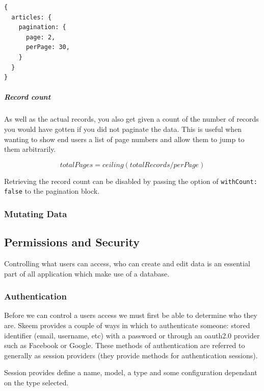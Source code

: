 \documentclass[
  12pt,
]{article}
\newcommand{\passthrough}[1]{#1}
\let\oldsubparagraph\subparagraph
\renewcommand{\subparagraph}[1]{\oldsubparagraph{#1}\mbox{}}
\begin{document}
\begin{lstlisting}[caption={This query will return the second page of articles where each page holds 30 records.}]
{
  articles: {
    pagination: {
      page: 2,
      perPage: 30,
    }
  }
}
\end{lstlisting}

\hypertarget{record-count}{%
\subparagraph{Record count}\label{record-count}}

As well as the actual records, you also get given a count of the number
of records you would have gotten if you did not paginate the data. This
is useful when wanting to show end users a list of page numbers and
allow them to jump to them arbitrarily.

\[ totalPages = ceiling( totalRecords / perPage ) \]

Retrieving the record count can be disabled by passing the option of
\passthrough{\lstinline!withCount: false!} to the pagination block.

\hypertarget{mutating-data}{%
\subsubsection{Mutating Data}\label{mutating-data}}

\hypertarget{permissions-and-security}{%
\subsection{Permissions and Security}\label{permissions-and-security}}

Controlling what users can access, who can create and edit data is an
essential part of all application which make use of a database.

\hypertarget{authentication-1}{%
\subsubsection{Authentication}\label{authentication-1}}

Before we can control a users access we must first be able to determine
who they are. Skeem provides a couple of ways in which to authenticate
someone: stored identifier (email, username, etc) with a password or
through an oauth2.0 provider such as Facebook or Google. These methods
of authentication are referred to generally as session providers (they
provide methods for authentication sessions).

Session provides define a name, model, a type and some configuration
dependant on the type selected.
\end{document}

